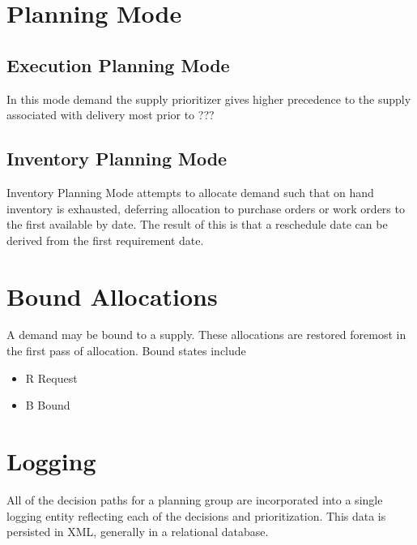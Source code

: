 \section{Planning Mode}
\subsection{Execution Planning Mode}
In this mode demand the supply prioritizer gives higher precedence to the supply associated with delivery
most  prior to ???

\subsection{Inventory Planning Mode}
Inventory Planning Mode attempts to allocate demand such that on hand inventory is exhausted, deferring 
allocation to purchase orders or work orders to the first available by date.  The result of this is
that a reschedule date can be derived from the first requirement date.

\section{Bound Allocations}
A demand may be bound to a supply.  These allocations are restored foremost in the first pass of allocation.
Bound states include
\begin{itemize}
 \item R Request 
 \item B Bound
\end{itemize}

\section{Logging}
All of the decision paths for a planning group are incorporated into a single logging entity reflecting
each of the decisions and prioritization.  This data is persisted in XML, generally in a relational database.
